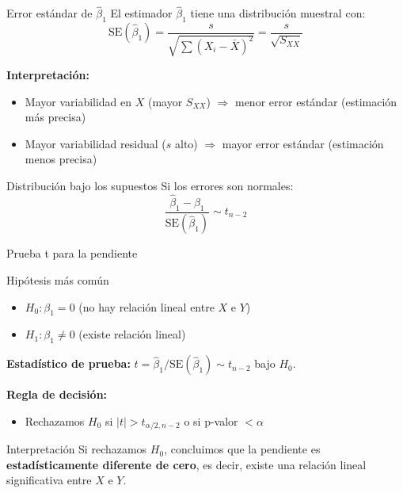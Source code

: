 \documentclass[aspectratio=169, 11pt]{beamer}
\begin{document}
\begin{frame}{Error estándar de $\hat{\beta}_1$}
El estimador $\hat{\beta}_1$ tiene una distribución muestral con:
\[
\text{SE}(\hat{\beta}_1) = \frac{s}{\sqrt{\sum(X_i - \bar{X})^2}} = \frac{s}{\sqrt{S_{XX}}}
\]

\vspace{0.2cm}
\textbf{Interpretación:}
\begin{itemize}
  \item Mayor variabilidad en $X$ (mayor $S_{XX}$) $\Rightarrow$ menor error estándar (estimación más precisa)
  \item Mayor variabilidad residual ($s$ alto) $\Rightarrow$ mayor error estándar (estimación menos precisa)
\end{itemize}

\vspace{0.3cm}
\begin{block}{Distribución bajo los supuestos}
Si los errores son normales:
\[
\frac{\hat{\beta}_1 - \beta_1}{\text{SE}(\hat{\beta}_1)} \sim t_{n-2}
\]
\end{block}
\end{frame}

\begin{frame}{Prueba t para la pendiente}
\begin{block}{Hip\'otesis m\'as com\'un}
\begin{itemize}
  \item $H_0: \beta_1 = 0$ (no hay relaci\'on lineal entre $X$ e $Y$)
  \item $H_1: \beta_1 \neq 0$ (existe relaci\'on lineal)
\end{itemize}
\end{block}

\vspace{0.1cm}
\textbf{Estad\'istico de prueba:}
$t = \hat{\beta}_1 / \text{SE}(\hat{\beta}_1) \sim t_{n-2}$ bajo $H_0$.

\vspace{0.1cm}
\textbf{Regla de decisi\'on:}
\begin{itemize}
  \item Rechazamos $H_0$ si $|t| > t_{\alpha/2, n-2}$ o si p-valor $< \alpha$
\end{itemize}

\vspace{0.1cm}
\begin{exampleblock}{Interpretaci\'on}
Si rechazamos $H_0$, concluimos que la pendiente es \textbf{estad\'isticamente diferente de cero}, es decir, existe una relaci\'on lineal significativa entre $X$ e $Y$.
\end{exampleblock}
\end{frame}
\end{document}
